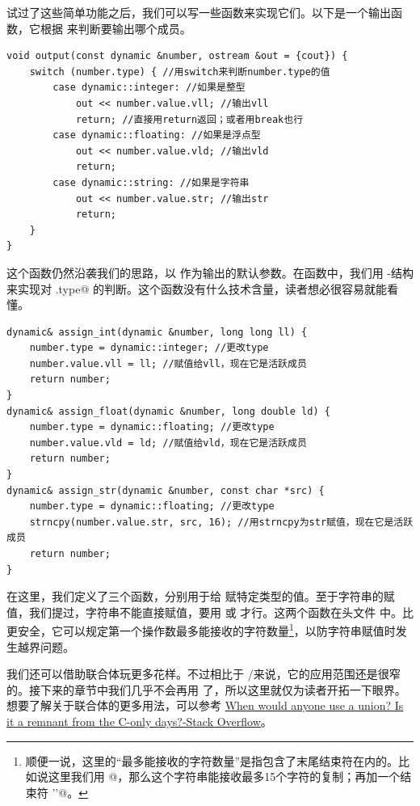 试过了这些简单功能之后，我们可以写一些函数来实现它们。以下是一个输出函数，它根据 \lstinline@type@ 来判断要输出哪个成员。
\begin{lstlisting}
void output(const dynamic &number, ostream &out = {cout}) {
    switch (number.type) { //用switch来判断number.type的值
        case dynamic::integer: //如果是整型
            out << number.value.vll; //输出vll
            return; //直接用return返回；或者用break也行
        case dynamic::floating: //如果是浮点型
            out << number.value.vld; //输出vld
            return;
        case dynamic::string: //如果是字符串
            out << number.value.str; //输出str
            return;
    }
}
\end{lstlisting}
这个函数仍然沿袭我们的思路，以 \lstinline@cout@ 作为输出的默认参数。在函数中，我们用 \lstinline@switch@-\lstinline@case@ 结构来实现对 \lstinline@number.type@ 的判断。这个函数没有什么技术含量，读者想必很容易就能看懂。\par
\begin{lstlisting}
dynamic& assign_int(dynamic &number, long long ll) {
    number.type = dynamic::integer; //更改type
    number.value.vll = ll; //赋值给vll，现在它是活跃成员
    return number;
}
dynamic& assign_float(dynamic &number, long double ld) {
    number.type = dynamic::floating; //更改type
    number.value.vld = ld; //赋值给vld，现在它是活跃成员
    return number;
}
dynamic& assign_str(dynamic &number, const char *src) {
    number.type = dynamic::floating; //更改type
    strncpy(number.value.str, src, 16); //用strncpy为str赋值，现在它是活跃成员
    return number;
}
\end{lstlisting}
在这里，我们定义了三个函数，分别用于给 \lstinline@number@ 赋特定类型的值。至于字符串的赋值，我们提过，字符串不能直接赋值，要用 \lstinline@strcpy@ 或 \lstinline@strncpy@ 才行。这两个函数在头文件 \lstinline@cstring@ 中。\lstinline@strncpy@ 比 \lstinline@strcpy@ 更安全，它可以规定第一个操作数最多能接收的字符数量\footnote{顺便一说，这里的``最多能接收的字符数量''是指包含了末尾结束符在内的。比如说这里我们用 @，那么这个字符串能接收最多15个字符的复制；再加一个结束符 \lstinline@'\0'@。}，以防字符串赋值时发生越界问题。\par
我们还可以借助联合体玩更多花样。不过相比于 \lstinline@class@/\lstinline@struct@ 来说，它的应用范围还是很窄的。接下来的章节中我们几乎不会再用 \lstinline@union@ 了，所以这里就仅为读者开拓一下眼界。想要了解关于联合体的更多用法，可以参考 \href{https://stackoverflow.com/questions/4788965/when-would-anyone-use-a-union-is-it-a-remnant-from-the-c-only-days}{When would anyone use a union? Is it a remnant from the C-only days?-Stack Overflow}。\par
